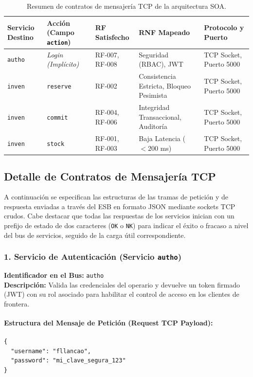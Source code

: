 \documentclass[12pt,a4paper]{article}
\begin{document}
\begin{table}[h!]
\centering
\footnotesize
\begin{tabularx}{\textwidth}{|l|l|l|X|X|}
\hline
\textbf{Servicio Destino} & \textbf{Acción (Campo \texttt{action})} & \textbf{RF Satisfecho} & \textbf{RNF Mapeado} & \textbf{Protocolo y Puerto} \\ \hline
\texttt{autho} & \textit{Login (Implícito)} & RF-007, RF-008 & Seguridad (RBAC), JWT & TCP Socket, Puerto 5000 \\ \hline
\texttt{inven} & \texttt{reserve} & RF-002 & Consistencia Estricta, Bloqueo Pesimista & TCP Socket, Puerto 5000 \\ \hline
\texttt{inven} & \texttt{commit} & RF-004, RF-006 & Integridad Transaccional, Auditoría & TCP Socket, Puerto 5000 \\ \hline
\texttt{inven} & \texttt{stock} & RF-001, RF-003 & Baja Latencia ($<200$ ms) & TCP Socket, Puerto 5000 \\ \hline
\end{tabularx}
\caption{Resumen de contratos de mensajería TCP de la arquitectura SOA.}
\end{table}

\subsection{Detalle de Contratos de Mensajería TCP}
A continuación se especifican las estructuras de las tramas de petición y de respuesta enviadas a través del ESB en formato JSON mediante sockets TCP crudos. Cabe destacar que todas las respuestas de los servicios inician con un prefijo de estado de dos caracteres (\texttt{OK} o \texttt{NK}) para indicar el éxito o fracaso a nivel del bus de servicios, seguido de la carga útil correspondiente.

\subsubsection{1. Servicio de Autenticación (Servicio \texttt{autho})}
\textbf{Identificador en el Bus:} \texttt{autho} \\
\textbf{Descripción:} Valida las credenciales del operario y devuelve un token firmado (JWT) con su rol asociado para habilitar el control de acceso en los clientes de frontera.

\paragraph{Estructura del Mensaje de Petición (Request TCP Payload):}
\begin{verbatim}
{
  "username": "fllancao",
  "password": "mi_clave_segura_123"
}
\end{verbatim}
\end{document}
